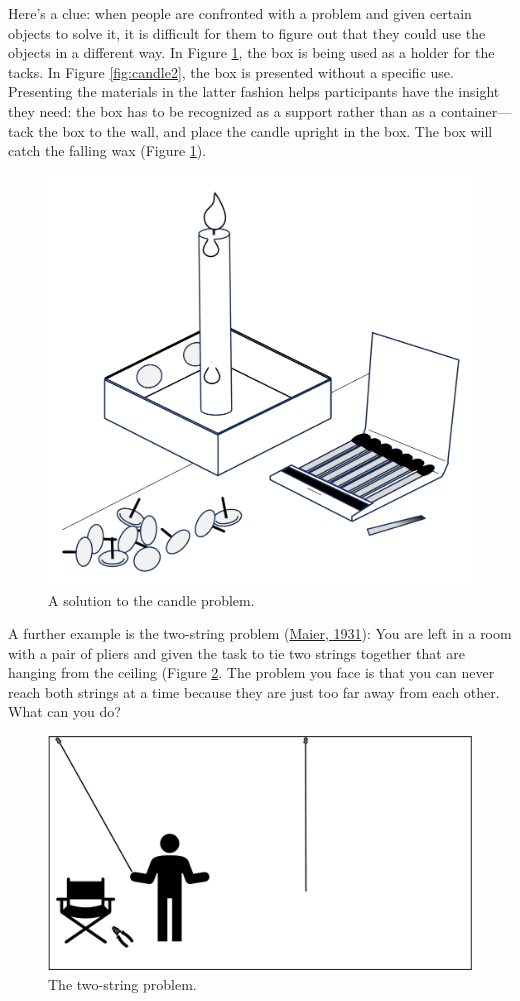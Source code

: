 \documentclass[
]{krantz}
\begin{document}
Here's a clue: when people are confronted with a problem and given certain objects to solve it, it is difficult for them to figure out that they could use the objects in a different way. In Figure \ref{fig:candle3}, the box is being used as a holder for the tacks. In Figure \ref{fig:candle2}, the box is presented without a specific use. Presenting the materials in the latter fashion helps participants have the insight they need: the box has to be recognized as a support rather than as a container--- tack the box to the wall, and place the candle upright in the box. The box will catch the falling wax (Figure \ref{fig:candle3}).

\begin{figure}

{\centering \includegraphics[width=0.45\linewidth]{images/ch10/candle3} 

}

\caption{A solution to the candle problem.}\label{fig:candle3}
\end{figure}

A further example is the two-string problem (\protect\hyperlink{ref-maier1931reasoning}{Maier, 1931}): You are left in a room with a pair of pliers and given the task to tie two strings together that are hanging from the ceiling (Figure \ref{fig:twostring}. The problem you face is that you can never reach both strings at a time because they are just too far away from each other. What can you do?

\begin{figure}

{\centering \includegraphics[width=0.6\linewidth]{images/ch10/twostring} 

}

\caption{The two-string problem.}\label{fig:twostring}
\end{figure}
\end{document}
